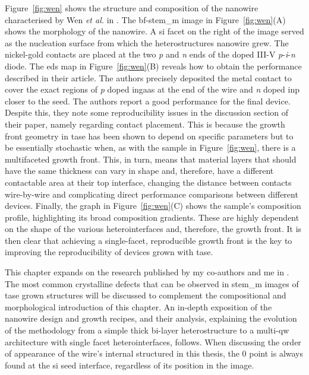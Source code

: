 Figure~\ref{fig:wen} shows the structure and composition of the nanowire characterised by Wen \textit{et al.} in \cite{Wen2022}. The \acs{bf}-\acs{stem_m} image in Figure~\ref{fig:wen}(A) shows the morphology of the nanowire. A  \acs{si} facet on the right of the image served as the nucleation surface from which the heterostructures nanowire grew. The nickel-gold contacts are placed at the two \textit{p} and \textit{n} ends of the doped III-V \textit{p}-\textit{i}-\textit{n} diode. The \acf{eds} map in Figure~\ref{fig:wen}(B) reveals how to obtain the performance described in their article. The authors precisely deposited the metal contact to cover the exact regions of \textit{p} doped \acs{ingaas} at the end of the wire and \textit{n} doped \acs{inp} closer to the seed. The authors report a good performance for the final device. Despite this, they note some reproducibility issues in the discussion section of their paper, namely regarding contact placement. This is because the growth front geometry in \acs{tase} has been shown to depend on specific parameters but to be essentially stochastic when, as with the sample in Figure~\ref{fig:wen}, there is a multifaceted growth front. This, in turn, means that material layers that should have the same thickness can vary in shape and, therefore, have a different contactable area at their top interface, changing the distance between contacts wire-by-wire and complicating direct performance comparisons between different devices. Finally, the graph in Figure~\ref{fig:wen}(C) shows the sample's composition profile, highlighting its broad composition gradients. These are highly dependent on the shape of the various heterointerfaces and, therefore, the growth front. It is then clear that achieving a single-facet, reproducible growth front is the key to improving the reproducibility of devices grown with \acs{tase}.

This chapter expands on the research published by my co-authors and me in \cite{Brugnolotto2023}. The most common crystalline defects that can be observed in \acs{stem_m} images of \acs{tase} grown structures will be discussed to complement the compositional and morphological introduction of this chapter. An in-depth exposition of the nanowire design and growth recipes, and their analysis, explaining the evolution of the methodology from a simple thick bi-layer heterostructure to a multi-\acl{qw} architecture with single facet heterointerfaces, follows. When discussing the order of appearance of the wire's internal structured in this thesis, the 0 point is always found at the \acs{si} seed interface, regardless of its position in the image.

